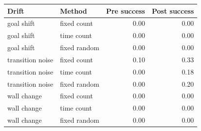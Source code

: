 \begin{tabular}{llrr}
\toprule
Drift & Method & Pre success & Post success \\
\midrule
goal shift & fixed count & 0.00 & 0.00 \\
goal shift & time count & 0.00 & 0.00 \\
goal shift & fixed random & 0.00 & 0.00 \\
transition noise & fixed count & 0.10 & 0.33 \\
transition noise & time count & 0.00 & 0.18 \\
transition noise & fixed random & 0.00 & 0.20 \\
wall change & fixed count & 0.00 & 0.00 \\
wall change & time count & 0.00 & 0.00 \\
wall change & fixed random & 0.00 & 0.00 \\
\bottomrule
\end{tabular}
